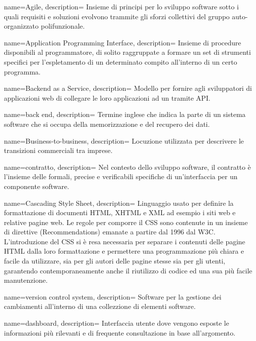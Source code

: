  {
name=Agile,
description={
Insieme di principi per lo sviluppo software sotto i quali requisiti e
soluzioni evolvono trammite gli sforzi collettivi del gruppo auto-organizzato
polifunzionale.
}
}

 {
name=Application Programming Interface,
description={
Insieme di procedure disponibili al programmatore, di solito raggruppate a
formare un set di strumenti specifici per l’espletamento di un determinato
compito all’interno di un certo programma.
}
}

 {
name=Backend as a Service,
description={
Modello per fornire agli sviluppatori di applicazioni web di collegare le loro
applicazioni ad un  tramite API.
}
}

 {
name=back end,
description={
Termine inglese che indica la parte di un sistema software che si occupa della
memorizzazione e del recupero dei dati.
}
}

 {
name=Business-to-business,
description={
Locuzione utilizzata per descrivere le transizioni commerciali tra imprese.
}
}

 {
name=contratto,
description={
Nel contesto dello sviluppo software, il contratto è l'insieme delle formali,
precise e verificabili specifiche di un'interfaccia per un componente software.
}
}

 {
name=Cascading Style Sheet,
description={
Linguaggio usato per definire la formattazione di documenti HTML, XHTML e
XML ad esempio i siti web e relative pagine web. Le regole per comporre il CSS
sono contenute in un insieme di direttive (Recommendations) emanate a partire
dal 1996 dal W3C. L’introduzione del CSS si è resa necessaria per separare i
contenuti delle pagine HTML dalla loro formattazione e permettere una
programmazione più chiara e facile da utilizzare, sia per gli autori delle
pagine stesse sia per gli utenti, garantendo contemporaneamente anche il
riutilizzo di codice ed una sua più facile manutenzione.
}
}

 {
name=version control system,
description={
Software per la gestione dei cambiamenti all'interno di una collezzione di
elementi software.
}
}

 {
name=dashboard,
description={
Interfaccia utente dove vengono esposte le informazioni più rilevanti e di
frequente consultazione in base all'argomento.
}
}

